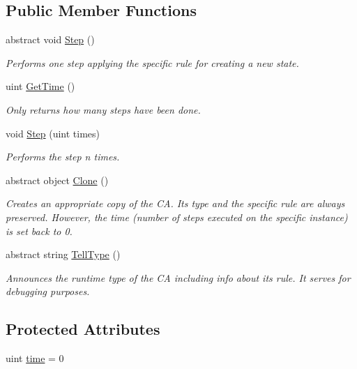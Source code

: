 \subsection*{Public Member Functions}
\begin{DoxyCompactItemize}
\item 
abstract void \hyperlink{class_cellular_1_1_cellular_automaton_aa70848d58015575974bc875ac5a89ae7}{Step} ()
\begin{DoxyCompactList}\small\item\em Performs one step applying the specific rule for creating a new state. \end{DoxyCompactList}\item 
uint \hyperlink{class_cellular_1_1_cellular_automaton_a340d1faea1300db9183b4b4368d4f838}{Get\+Time} ()
\begin{DoxyCompactList}\small\item\em Only returns how many steps have been done. \end{DoxyCompactList}\item 
void \hyperlink{class_cellular_1_1_cellular_automaton_ad4948be8db73c5e052e2c5e59ac85ad8}{Step} (uint times)
\begin{DoxyCompactList}\small\item\em Performs the step n times. \end{DoxyCompactList}\item 
abstract object \hyperlink{class_cellular_1_1_cellular_automaton_affd487b397cdbbbb1982815bbcd8e7d3}{Clone} ()
\begin{DoxyCompactList}\small\item\em Creates an appropriate copy of the C\+A. Its type and the specific rule are always preserved. However, the time (number of steps executed on the specific instance) is set back to 0. \end{DoxyCompactList}\item 
abstract string \hyperlink{class_cellular_1_1_cellular_automaton_abe4b92fd405530c8a08cc07a3a19fff4}{Tell\+Type} ()
\begin{DoxyCompactList}\small\item\em Announces the runtime type of the C\+A including info about its rule. It serves for debugging purposes. \end{DoxyCompactList}\end{DoxyCompactItemize}
\subsection*{Protected Attributes}
\begin{DoxyCompactItemize}
\item 
uint \hyperlink{class_cellular_1_1_cellular_automaton_a6eaa8a9840fbc4c875d4e7d5a14e5f70}{time} = 0
\end{DoxyCompactItemize}


